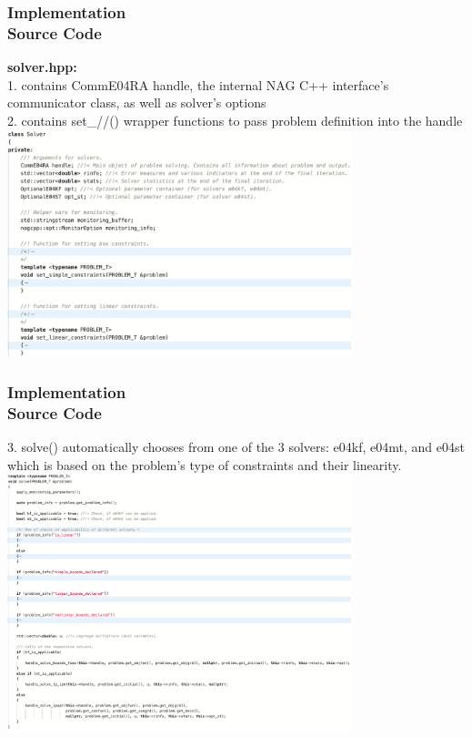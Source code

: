 \documentclass[ucs,10pt]{beamer}
\begin{document}
\begin{frame}
\frametitle{Implementation \\
\small \color{rwth-blue} Source Code}
\vspace{1ex}
\textbf{solver.hpp:}\\ \vspace{1ex}
1. contains CommE04RA handle, the internal NAG C++ interface’s communicator class, as well as solver’s options\\
2. contains set\_//() wrapper functions to pass problem definition into the handle\\
\includegraphics[width=0.75\textwidth]{code_solver1.png}
\end{frame}

\begin{frame}
\frametitle{Implementation \\
\small \color{rwth-blue} Source Code}
3. solve() automatically chooses from one of the 3 solvers: e04kf, e04mt, and e04st which is based on the problem’s type of constraints and their linearity.\\
\includegraphics[width=0.75\textwidth]{code_solver2.png}
\end{frame}
\end{document}
